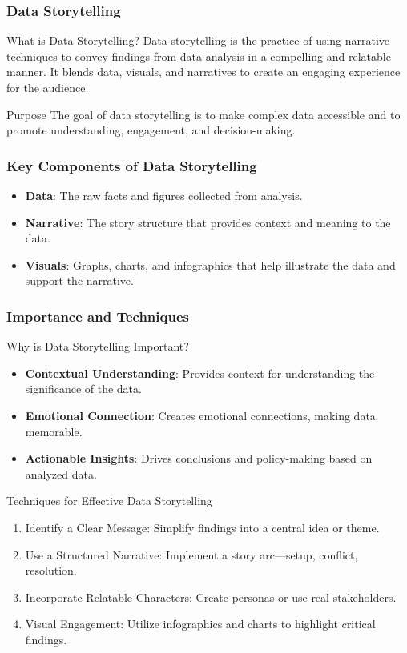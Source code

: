 \documentclass{beamer}
\begin{document}
\begin{frame}[fragile]
    \frametitle{Data Storytelling}
    \begin{block}{What is Data Storytelling?}
        Data storytelling is the practice of using narrative techniques to convey findings from data analysis in a compelling and relatable manner. 
        It blends data, visuals, and narratives to create an engaging experience for the audience.
    \end{block}
    \begin{block}{Purpose}
        The goal of data storytelling is to make complex data accessible and to promote understanding, engagement, and decision-making.
    \end{block}
\end{frame}

\begin{frame}[fragile]
    \frametitle{Key Components of Data Storytelling}
    \begin{itemize}
        \item \textbf{Data}: The raw facts and figures collected from analysis.
        \item \textbf{Narrative}: The story structure that provides context and meaning to the data.
        \item \textbf{Visuals}: Graphs, charts, and infographics that help illustrate the data and support the narrative.
    \end{itemize}
\end{frame}

\begin{frame}[fragile]
    \frametitle{Importance and Techniques}
    \begin{block}{Why is Data Storytelling Important?}
        \begin{itemize}
            \item \textbf{Contextual Understanding}: Provides context for understanding the significance of the data.
            \item \textbf{Emotional Connection}: Creates emotional connections, making data memorable.
            \item \textbf{Actionable Insights}: Drives conclusions and policy-making based on analyzed data.
        \end{itemize}
    \end{block}
    
    \begin{block}{Techniques for Effective Data Storytelling}
        \begin{enumerate}
            \item Identify a Clear Message: Simplify findings into a central idea or theme.
            \item Use a Structured Narrative: Implement a story arc—setup, conflict, resolution.
            \item Incorporate Relatable Characters: Create personas or use real stakeholders.
            \item Visual Engagement: Utilize infographics and charts to highlight critical findings.
        \end{enumerate}
    \end{block}
\end{frame}
\end{document}
